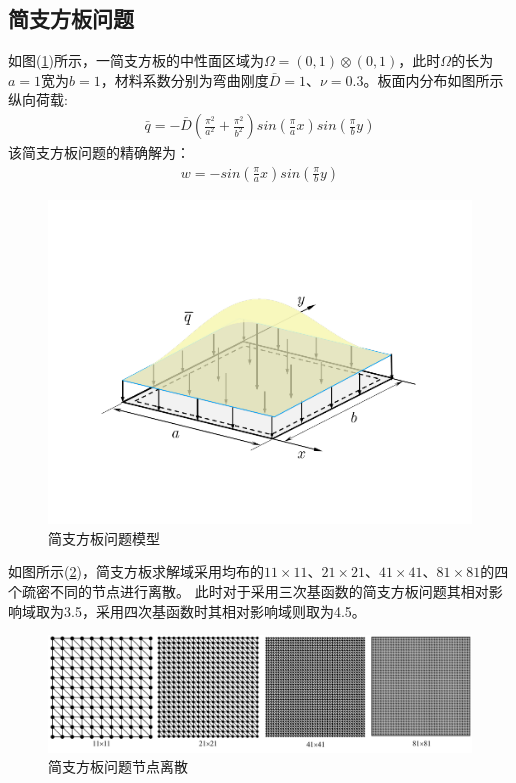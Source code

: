 \subsection{简支方板问题}
如图(\ref{rectangular})所示，一简支方板的中性面区域为$\Omega=(0,1)\otimes(0,1)$，此时$\Omega$的长为$a=1$宽为$b=1$，材料系数分别为弯曲刚度$\bar{D}=1$、$\nu=0.3$。板面内分布如图所示纵向荷载:
\begin{equation}
\begin{split}
    \bar q=-\bar D(\frac{\pi^2}{a^2}+\frac{\pi^2}{b^2})sin(\frac{\pi}{a}x)sin(\frac{\pi}{b}y)
\end{split}
\end{equation}
该简支方板问题的精确解为：
\begin{equation}
\begin{split}
    w=-sin(\frac{\pi}{a}x)sin(\frac{\pi}{b}y)
\end{split}
\end{equation}
\begin{figure}[H]
\centering
    \includegraphics[scale=0.7]{figure/PHR/R/rectangular.png}
    \caption{简支方板问题模型}\label{rectangular}
\end{figure}
如图所示(\ref{rectangularmsh})，简支方板求解域采用均布的$11\times 11$、$21\times 21$、$41\times 41$、$81\times 81$的四个疏密不同的节点进行离散。
此时对于采用三次基函数的简支方板问题其相对影响域取为3.5，采用四次基函数时其相对影响域则取为4.5。\par
\newpage
\begin{figure}[H]
\centering
      \includegraphics[scale=0.4]{figure/PHR/R/rectangularmsh.png}
    \caption{简支方板问题节点离散}\label{rectangularmsh}
\end{figure}
